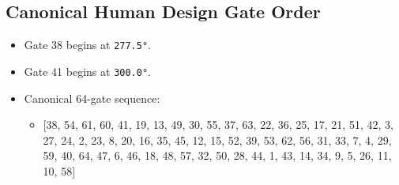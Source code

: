 \documentclass[11pt]{article}
\begin{document}
\subsection{Canonical Human Design Gate Order}
\label{sec:orgd62462b}
\begin{itemize}
\item Gate 38 begins at \texttt{277.5°}.
\item Gate 41 begins at \texttt{300.0°}.
\item Canonical 64-gate sequence:
\begin{itemize}
\item {[}38, 54, 61, 60, 41, 19, 13, 49, 30, 55, 37, 63, 22, 36, 25, 17, 21, 51, 42, 3, 27, 24, 2, 23, 8, 20, 16, 35, 45, 12, 15, 52, 39, 53, 62, 56, 31, 33, 7, 4, 29, 59, 40, 64, 47, 6, 46, 18, 48, 57, 32, 50, 28, 44, 1, 43, 14, 34, 9, 5, 26, 11, 10, 58]
\end{itemize}
\end{itemize}
\end{document}

